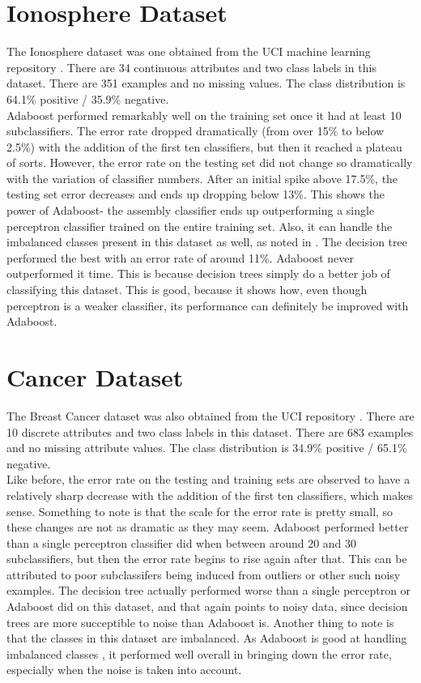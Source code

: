 \documentclass{article}
\begin{document}
\section{Ionosphere Dataset}

The Ionosphere dataset was one obtained from the UCI machine learning repository \cite{ionosphere}. There are 34 continuous attributes and two class labels in this dataset. There are 351 examples and no missing values. The class distribution is 64.1\% positive / 35.9\% negative. \\

Adaboost performed remarkably well on the training set once it had at least 10 subclassifiers. The error rate dropped dramatically (from over 15\% to below 2.5\%) with the addition of the first ten classifiers, but then it reached a plateau of sorts. However, the error rate on the testing set did not change so dramatically with the variation of classifier numbers. After an initial spike above 17.5\%, the testing set error decreases and ends up dropping below 13\%. This shows the power of Adaboost- the assembly classifier ends up outperforming a single perceptron classifier trained on the entire training set. Also, it can handle the imbalanced classes present in this dataset as well, as noted in \cite{sun-kamel-wang}. The decision tree performed the best with an error rate of around 11\%. Adaboost never outperformed it time. This is because decision trees simply do a better job of classifying this dataset. This is good, because it shows how, even though perceptron is a weaker classifier, its performance can definitely be improved with Adaboost.

\section{Cancer Dataset}

The Breast Cancer dataset was also obtained from the UCI repository \cite{cancer}. There are 10 discrete attributes and two class labels in this dataset. There are 683 examples and no missing attribute values. The class distribution is 34.9\% positive / 65.1\% negative. \\

Like before, the error rate on the testing and training sets are observed to have a relatively sharp decrease with the addition of the first ten classifiers, which makes sense. Something to note is that the scale for the error rate is pretty small, so these changes are not as dramatic as they may seem. Adaboost performed better than a single perceptron classifier did when between around 20 and 30 subclassifiers, but then the error rate begins to rise again after that. This can be attributed to poor subclassifers being induced from outliers or other such noisy examples. The decision tree actually performed worse than a single perceptron or Adaboost did on this dataset, and that again points to noisy data, since decision trees are more succeptible to noise than Adaboost is. Another thing to note is that the classes in this dataset are imbalanced. As Adaboost is good at handling imbalanced classes \cite{sun-kamel-wang}, it performed well overall in bringing down the error rate, especially when the noise is taken into account.
\end{document}
